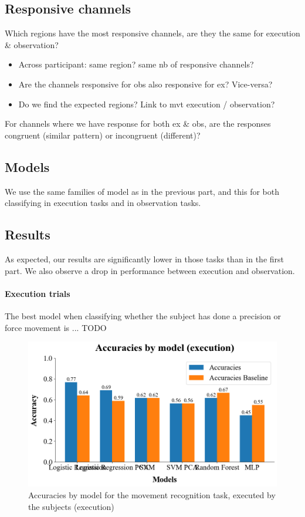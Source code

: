 \documentclass[10pt,conference,compsocconf]{IEEEtran}
\begin{document}
\subsection{Responsive channels}
Which regions have the most responsive channels, are they the same for execution \& observation?

\begin{itemize}
    \item Across participant: same region? same nb of responsive channels?
    \item Are the channels responsive for obs also responsive for ex? Vice-versa?
    \item Do we find the expected regions? Link to mvt execution / observation?
\end{itemize}

For channels where we have response for both ex \& obs, are the responses congruent (similar pattern) or incongruent (different)?

\subsection{Models}
We use the same families of model as in the previous part, and this for both classifying in execution tasks and in observation tasks.

\subsection{Results}
As expected, our results are significantly lower in those tasks than in the first part. We also observe a drop in performance between execution and observation.

\paragraph{Execution trials}
The best model when classifying whether the subject has done a precision or force movement is ... TODO

\begin{figure}[h!]
  \center
  \includegraphics[width=\linewidth]{images/2024-12-15-14-43-56.png}
  \caption{Accuracies by model for the movement recognition task, executed by the subjects (execution)}
\end{figure}
\FloatBarrier
\end{document}

